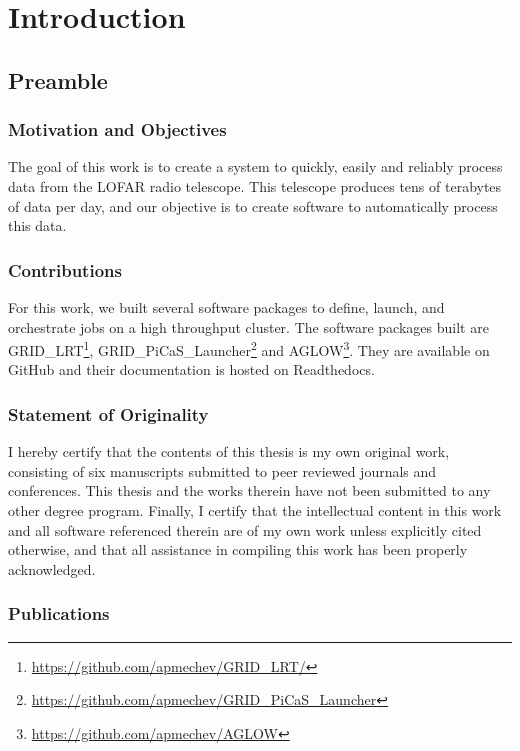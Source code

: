 \chapter{Introduction}


\section{Preamble}

\subsection{Motivation and Objectives}

The goal of this work is to create a system to quickly, easily and reliably process data from the LOFAR radio telescope. This telescope produces tens of terabytes of data per day, and our objective is to create software to automatically process this data.  




\subsection{Contributions}
 
For this work, we built several software packages to define, launch, and orchestrate jobs on a high throughput cluster. The software packages built are GRID\_LRT\footnote{\url{https://github.com/apmechev/GRID_LRT/}}, GRID\_PiCaS\_Launcher\footnote{\url{https://github.com/apmechev/GRID_PiCaS_Launcher}} and AGLOW\footnote{\url{https://github.com/apmechev/AGLOW}}. They are available on GitHub and their documentation is hosted on Readthedocs.  



\subsection{Statement of Originality}

I hereby certify that the contents of this thesis is my own original work, consisting of six manuscripts submitted to peer reviewed journals and conferences. This thesis and the works therein have not been submitted to any other degree program. Finally, I certify that the intellectual content in this work and all software referenced therein are of my own work unless explicitly cited otherwise, and that all assistance in compiling this work has been properly acknowledged.

\subsection{Publications}


